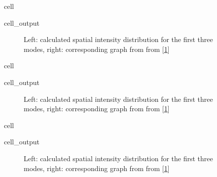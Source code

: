 \documentclass[a4paper,10pt,english,openany,oneside]{jupyterBook}
\begin{document}
\begin{sphinxuseclass}{cell}\begin{sphinxVerbatimOutput}

\begin{sphinxuseclass}{cell_output}
\begin{figure}[htbp]
\centering
\capstart

\noindent{}
\caption{Left: calculated spatial intensity distribution for the first three modes, right: corresponding graph from from {[}\hyperlink{cite.bib:id3}{1}{]}}\label{\detokenize{Kogelnik-Shank_Coupled-Wave-Theory_DFB-Lasers:kogelnik12bc}}\end{figure}

\end{sphinxuseclass}\end{sphinxVerbatimOutput}

\end{sphinxuseclass}
\begin{sphinxuseclass}{cell}\begin{sphinxVerbatimOutput}

\begin{sphinxuseclass}{cell_output}
\begin{figure}[htbp]
\centering
\capstart

\noindent{}
\caption{Left: calculated spatial intensity distribution for the first three modes, right: corresponding graph from from {[}\hyperlink{cite.bib:id3}{1}{]}}\label{\detokenize{Kogelnik-Shank_Coupled-Wave-Theory_DFB-Lasers:kogelnik12cc}}\end{figure}

\end{sphinxuseclass}\end{sphinxVerbatimOutput}

\end{sphinxuseclass}
\begin{sphinxuseclass}{cell}\begin{sphinxVerbatimOutput}

\begin{sphinxuseclass}{cell_output}
\begin{figure}[htbp]
\centering
\capstart

\noindent{}
\caption{Left: calculated spatial intensity distribution for the first three modes, right: corresponding graph from from {[}\hyperlink{cite.bib:id3}{1}{]}}\label{\detokenize{Kogelnik-Shank_Coupled-Wave-Theory_DFB-Lasers:kogelnik12dc}}\end{figure}

\end{sphinxuseclass}\end{sphinxVerbatimOutput}

\end{sphinxuseclass}
\sphinxstepscope
\end{document}
